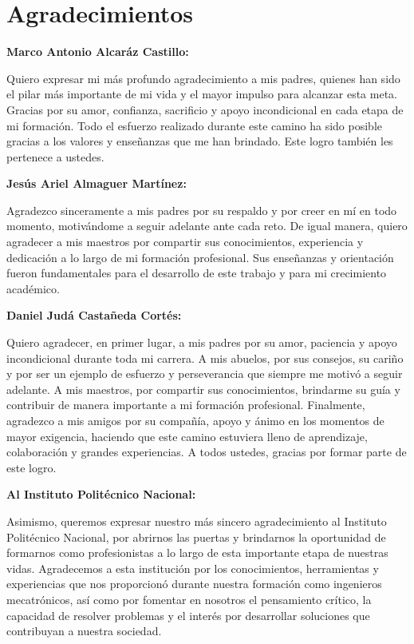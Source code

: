 \chapter{Agradecimientos}

\textbf{Marco Antonio Alcaráz Castillo:}

Quiero expresar mi más profundo agradecimiento a mis padres, quienes han sido el pilar más importante de mi vida y el mayor impulso para alcanzar esta meta. Gracias por su amor, confianza, sacrificio y apoyo incondicional en cada etapa de mi formación. Todo el esfuerzo realizado durante este camino ha sido posible gracias a los valores y enseñanzas que me han brindado. Este logro también les pertenece a ustedes.

\vspace{0.5cm}
\textbf{Jesús Ariel Almaguer Martínez:}

Agradezco sinceramente a mis padres por su respaldo y por creer en mí en todo momento, motivándome a seguir adelante ante cada reto. De igual manera, quiero agradecer a mis maestros por compartir sus conocimientos, experiencia y dedicación a lo largo de mi formación profesional. Sus enseñanzas y orientación fueron fundamentales para el desarrollo de este trabajo y para mi crecimiento académico.

\vspace{0.5cm}
\textbf{Daniel Judá Castañeda Cortés:}

Quiero agradecer, en primer lugar, a mis padres por su amor, paciencia y apoyo incondicional durante toda mi carrera. A mis abuelos, por sus consejos, su cariño y por ser un ejemplo de esfuerzo y perseverancia que siempre me motivó a seguir adelante. A mis maestros, por compartir sus conocimientos, brindarme su guía y contribuir de manera importante a mi formación profesional. Finalmente, agradezco a mis amigos por su compañía, apoyo y ánimo en los momentos de mayor exigencia, haciendo que este camino estuviera lleno de aprendizaje, colaboración y grandes experiencias. A todos ustedes, gracias por formar parte de este logro.

\vspace{0.5cm}
\textbf{Al Instituto Politécnico Nacional:}

Asimismo, queremos expresar nuestro más sincero agradecimiento al Instituto Politécnico Nacional, por abrirnos las puertas y brindarnos la oportunidad de formarnos como profesionistas a lo largo de esta importante etapa de nuestras vidas. Agradecemos a esta institución por los conocimientos, herramientas y experiencias que nos proporcionó durante nuestra formación como ingenieros mecatrónicos, así como por fomentar en nosotros el pensamiento crítico, la capacidad de resolver problemas y el interés por desarrollar soluciones que contribuyan a nuestra sociedad.

